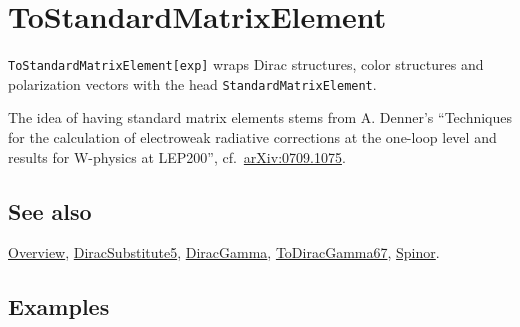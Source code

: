 \documentclass[../FeynCalcManual.tex]{subfiles}
\begin{document}
\hypertarget{tostandardmatrixelement}{
\section{ToStandardMatrixElement}\label{tostandardmatrixelement}}

\texttt{ToStandardMatrixElement[\allowbreak{}exp]} wraps Dirac
structures, color structures and polarization vectors with the head
\texttt{StandardMatrixElement}.

The idea of having standard matrix elements stems from A. Denner's
``Techniques for the calculation of electroweak radiative corrections at
the one-loop level and results for W-physics at LEP200'',
cf.~\href{https://arxiv.org/abs/0709.1075}{arXiv:0709.1075}.

\subsection{See also}

\hyperlink{toc}{Overview},
\hyperlink{diracsubstitute5}{DiracSubstitute5},
\hyperlink{diracgamma}{DiracGamma},
\hyperlink{todiracgamma67}{ToDiracGamma67}, \hyperlink{spinor}{Spinor}.

\subsection{Examples}

\begin{Shaded}
\begin{Highlighting}[]
\OperatorTok{[}\OperatorTok{[}\OperatorTok{,} \OperatorTok{],} \OperatorTok{,} \OperatorTok{]}\OperatorTok{[}\SpecialCharTok{\textbackslash{}}\OperatorTok{[}\OperatorTok{]]}\OperatorTok{[}\SpecialCharTok{{-}}\OperatorTok{[}\OperatorTok{,} \OperatorTok{],} \OperatorTok{,} \OperatorTok{]}\SpecialCharTok{*}
\OperatorTok{[}\SpecialCharTok{{-}}\OperatorTok{[}\OperatorTok{,} \OperatorTok{],}\OperatorTok{[}\OperatorTok{],} \OperatorTok{]}\OperatorTok{[}\SpecialCharTok{\textbackslash{}}\OperatorTok{[}\OperatorTok{]]}\OperatorTok{[}\OperatorTok{[}\OperatorTok{,} \OperatorTok{],}\OperatorTok{[}\OperatorTok{],} \OperatorTok{]} 
 
\OperatorTok{[}\SpecialCharTok{\%}\OperatorTok{]}
\end{Highlighting}
\end{Shaded}
\end{document}
